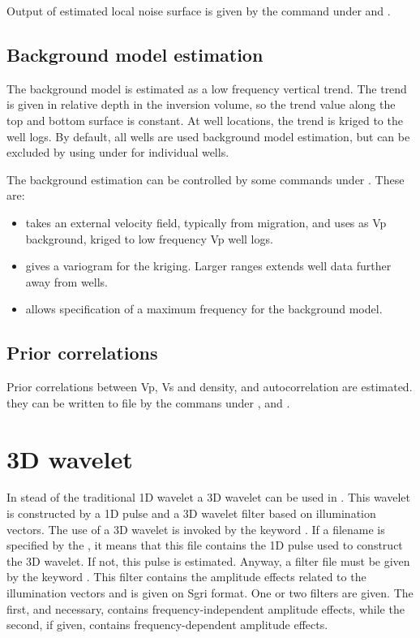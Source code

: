 Output of estimated local noise surface is given by the command  under  and . 

\subsection{Background model estimation}
The background model is estimated as a low frequency vertical
trend. The trend is given in relative depth in the inversion volume,
so the trend value along the top and bottom surface is constant. At
well locations, the trend is kriged to the well logs. By default, all
wells are used background model estimation, but can be excluded by
using  under  for individual
wells. 

The background estimation can be controlled by some commands under
. These are: 
\begin{itemize}
\item {} takes an external velocity field, typically
  from migration, and uses as Vp background, kriged to low frequency
  Vp well logs. 
\item {} gives a variogram for the
  kriging. Larger ranges extends well data further away from wells. 
\item {} allows specification of a maximum frequency for
  the background model. 
\end{itemize}

\subsection{Prior correlations}
Prior correlations between Vp, Vs and density, and autocorrelation are estimated. they can be written to file by the commans  under ,  and .

\section{3D wavelet}
In stead of the traditional 1D wavelet a 3D wavelet can be used in \crava. This wavelet is constructed by a 1D pulse and a 3D wavelet filter based on illumination vectors.
The use of a 3D wavelet is invoked by the keyword . If a filename is specified by the , it means that this file contains the 1D pulse used to construct the 3D wavelet. If not, this pulse is estimated. Anyway, a filter file must be given by the keyword . This filter contains the amplitude effects related to the illumination vectors and is given on Sgri format. One or two filters are given. The first, and necessary, contains frequency-independent amplitude effects, while the second, if given, contains frequency-dependent amplitude effects.

